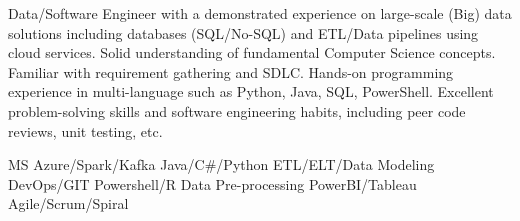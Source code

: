 \documentclass[a4paper]{ReadableCV}
\begin{document}
	






\showHeader



Data/Software Engineer with a demonstrated experience on large-scale (Big) data solutions including databases (SQL/No-SQL) and ETL/Data pipelines using cloud services. Solid understanding of fundamental Computer Science concepts. Familiar with requirement gathering and SDLC. Hands-on programming experience in multi-language such as Python, Java, SQL, PowerShell. Excellent problem-solving skills and software engineering habits, including peer code reviews, unit testing, etc.


	      {MS Azure/Spark/Kafka}
		  {Java/C\#/Python}
		  {ETL/ELT/Data Modeling}
		  {DevOps/GIT}
		  {Powershell/R}
		  {Data Pre-processing}
		  {PowerBI/Tableau}
		  {Agile/Scrum/Spiral}
		  

\end{document}
